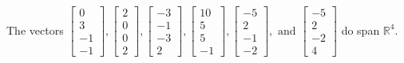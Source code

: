 \begin{exercise}
\begin{exerciseStatement}
  \end{exerciseStatement}
  \begin{exerciseAnswer}
   The vectors \(\left[\begin{array}{r}
0 \\
3 \\
-1 \\
-1
\end{array}\right] , \left[\begin{array}{r}
2 \\
0 \\
0 \\
2
\end{array}\right] , \left[\begin{array}{r}
-3 \\
-1 \\
-3 \\
2
\end{array}\right] , \left[\begin{array}{r}
10 \\
5 \\
5 \\
-1
\end{array}\right] , \left[\begin{array}{r}
-5 \\
2 \\
-1 \\
-2
\end{array}\right] , \text{ and } \left[\begin{array}{r}
-5 \\
2 \\
-2 \\
4
\end{array}\right]\) 
  	 do  
	span \(\mathbb{R}^4\).
  


  \end{exerciseAnswer}
\end{exercise}
